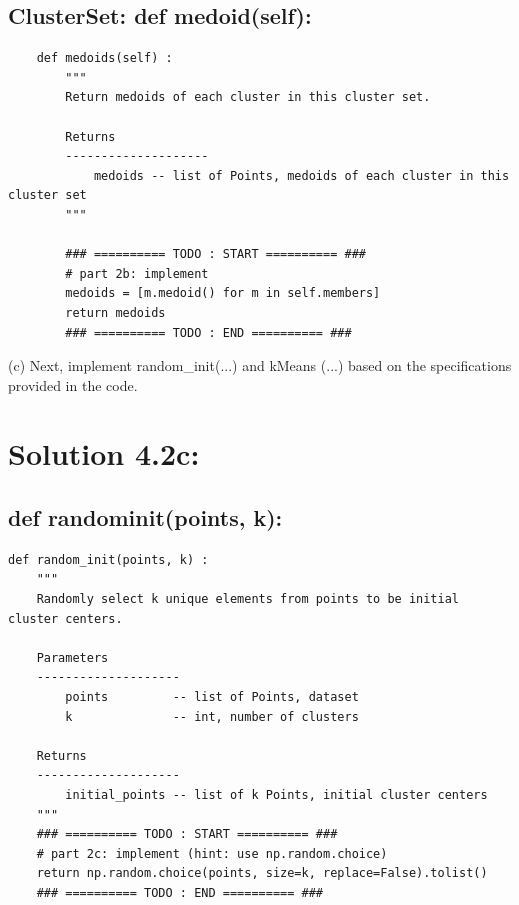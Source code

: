 \documentclass[10pt]{article}
\begin{document}
\subsection*{ClusterSet: def medoid(self):}

\begin{verbatim}
    def medoids(self) :
        """
        Return medoids of each cluster in this cluster set.

        Returns
        --------------------
            medoids -- list of Points, medoids of each cluster in this cluster set
        """

        ### ========== TODO : START ========== ###
        # part 2b: implement
        medoids = [m.medoid() for m in self.members]
        return medoids
        ### ========== TODO : END ========== ###
\end{verbatim}

(c) Next, implement random\_init(...) and kMeans (...) based on the specifications provided in the code.

\section*{Solution 4.2c:}

\subsection*{def random\textunderscore init(points, k):}
\begin{verbatim}
def random_init(points, k) :
    """
    Randomly select k unique elements from points to be initial cluster centers.

    Parameters
    --------------------
        points         -- list of Points, dataset
        k              -- int, number of clusters

    Returns
    --------------------
        initial_points -- list of k Points, initial cluster centers
    """
    ### ========== TODO : START ========== ###
    # part 2c: implement (hint: use np.random.choice)
    return np.random.choice(points, size=k, replace=False).tolist()
    ### ========== TODO : END ========== ###
\end{verbatim}
\end{document}
